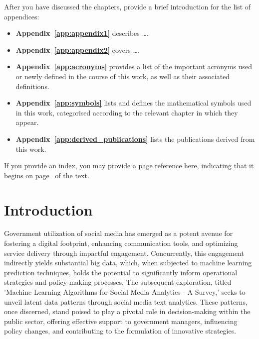 After you have discussed the chapters, provide a brief introduction for the list of appendices:
\begin{itemize}
	\item\textbf{Appendix~\ref{app:appendix1}} describes \ldots.
	
	\item\textbf{Appendix~\ref{app:appendix2}} covers \ldots.
	
	\item\textbf{Appendix~\ref{app:acronyms}} provides a list of the important acronyms used or newly defined in the course of this work, as well as their associated definitions.
	
	\item\textbf{Appendix~\ref{app:symbols}} lists and defines the mathematical symbols used in this work, categorised according to the relevant chapter in which they appear.
	
	\item\textbf{Appendix~\ref{app:derived_publications}} lists the publications derived from this work.
\end{itemize}

If you provide an index, you may provide a page reference here, indicating that it begins on page~\pageref{index} of the text.


\section{Introduction}
\label{sec:first:Intro}


Government utilization of social media has emerged as a potent avenue for fostering a digital footprint, enhancing communication tools, and optimizing service delivery through impactful engagement. Concurrently, this engagement indirectly yields substantial big data, which, when subjected to machine learning prediction techniques, holds the potential to significantly inform operational strategies and policy-making processes. The subsequent exploration, titled 'Machine Learning Algorithms for Social Media Analytics - A Survey,' seeks to unveil latent data patterns through social media text analytics. These patterns, once discerned, stand poised to play a pivotal role in decision-making within the public sector, offering effective support to government managers, influencing policy changes, and contributing to the formulation of innovative strategies.

